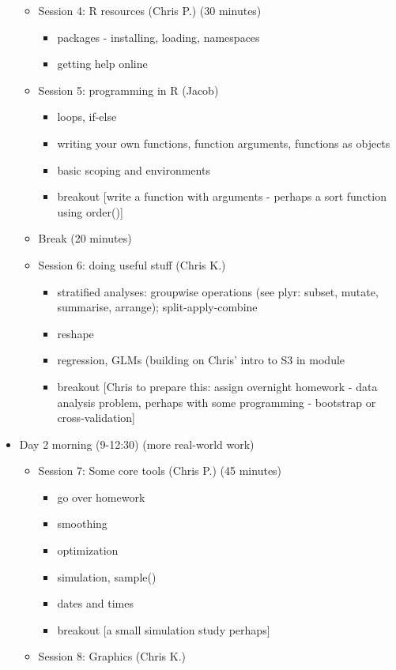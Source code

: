 \documentclass[12pt]{article}\usepackage{graphicx, color}
\begin{document}
\begin{itemize}
\begin{itemize}
\item Session 4: R resources (Chris P.) (30 minutes)

\begin{itemize}
\item packages - installing, loading, namespaces
\item getting help online 
\end{itemize}
\item Session 5: programming in R (Jacob)

\begin{itemize}
\item loops, if-else
\item writing your own functions, function arguments, functions as objects
\item basic scoping and environments
\item breakout {[}write a function with arguments - perhaps a sort function
using order(){]}
\end{itemize}
\item Break (20 minutes)
\item Session 6: doing useful stuff (Chris K.)

\begin{itemize}
\item stratified analyses: groupwise operations (see plyr: subset, mutate,
summarise, arrange); split-apply-combine
\item reshape
\item regression, GLMs (building on Chris' intro to S3 in module 
\item breakout {[}Chris to prepare this: assign overnight homework - data
analysis problem, perhaps with some programming - bootstrap or cross-validation{]}
\end{itemize}
\end{itemize}
\item Day 2 morning (9-12:30) (more real-world work)

\begin{itemize}
\item Session 7: Some core tools (Chris P.) (45 minutes)

\begin{itemize}
\item go over homework
\item smoothing
\item optimization
\item simulation, sample()
\item dates and times
\item breakout {[}a small simulation study perhaps{]}
\end{itemize}
\item Session 8: Graphics (Chris K.)


\end{itemize}
\end{itemize}
\end{document}
